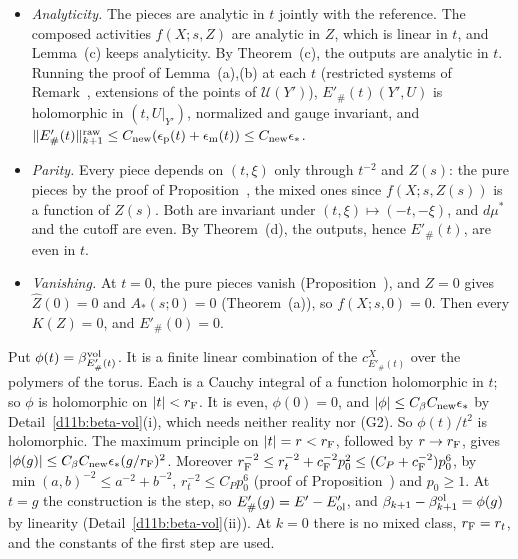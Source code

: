\begin{step}
\begin{itemize}
\item \emph{Analyticity.} The pieces are analytic in $t$ jointly with the reference. The composed activities $f(X;s,Z)$ are analytic in $Z$, which is linear in $t$, and Lemma~(c) keeps analyticity. By Theorem~(c), the outputs are analytic in $t$. Running the proof of Lemma~(a),(b) at each $t$ (restricted systems of Remark~, extensions of the points of $\mathcal U(Y')$), $E'_\#(t)(Y',U)$ is holomorphic in $(t,U|_{Y'})$, normalized and gauge invariant, and $\|E'_\#(t)\|^{\rm raw}_{k+1}\le C_{\rm new}(\epsilon_{\rm p}(t)+\epsilon_{\rm m}(t))\le C_{\rm new}\epsilon_*$.
\item \emph{Parity.} Every piece depends on $(t,\xi)$ only through $t^{-2}$ and $Z(s)$: the pure pieces by the proof of Proposition~, the mixed ones since $f(X;s,Z(s))$ is a function of $Z(s)$. Both are invariant under $(t,\xi)\mapsto(-t,-\xi)$, and $d\mu^*$ and the cutoff are even. By Theorem~(d), the outputs, hence $E'_\#(t)$, are even in $t$.
\item \emph{Vanishing.} At $t=0$, the pure pieces vanish (Proposition~), and $Z=0$ gives $\hat Z(0)=0$ and $A_*(s;0)=0$ (Theorem~(a)), so $f(X;s,0)=0$. Then every $K(Z)=0$, and $E'_\#(0)=0$.
\end{itemize}
\end{step}

\begin{step}
Put $\phi(t)=\beta^{\rm vol}_{E'_\#(t)}$. It is a finite linear combination of the $c^X_{E'_\#(t)}$ over the polymers of the torus. Each is a Cauchy integral of a function holomorphic in $t$; so $\phi$ is holomorphic on $|t|<r_{\rm F}$. It is even, $\phi(0)=0$, and $|\phi|\le C_\beta C_{\rm new}\epsilon_*$ by Detail~\ref{d11b:beta-vol}(i), which needs neither reality nor (G2). So $\phi(t)/t^2$ is holomorphic. The maximum principle on $|t|=r<r_{\rm F}$, followed by $r\to r_{\rm F}$, gives $|\phi(g)|\le C_\beta C_{\rm new}\epsilon_*(g/r_{\rm F})^2$. Moreover $r_{\rm F}^{-2}\le r_t^{-2}+c_{\rm F}^{-2}p_0^2\le(C_P+c_{\rm F}^{-2})p_0^6$, by $\min(a,b)^{-2}\le a^{-2}+b^{-2}$, $r_t^{-2}\le C_Pp_0^6$ (proof of Proposition~) and $p_0\ge1$. At $t=g$ the construction is the step, so $E'_\#(g)=E'-E'_{\rm ol}$, and $\beta_{k+1}-\beta^{\rm ol}_{k+1}=\phi(g)$ by linearity (Detail~\ref{d11b:beta-vol}(ii)). At $k=0$ there is no mixed class, $r_{\rm F}=r_t$, and the constants of the first step are used.
\end{step}

